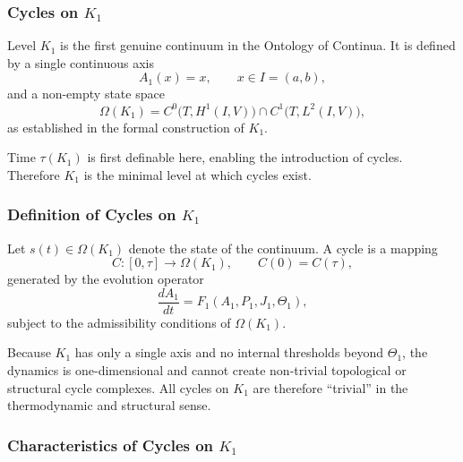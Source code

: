 
\subsubsection{Cycles on \texorpdfstring{$K_1$}{K_1}}
\label{sec:cycles-k1}

Level $K_1$ is the first genuine continuum in the Ontology of
Continua.  
It is defined by a single continuous axis
\[
  A_1(x)=x, \qquad x\in I=(a,b),
\]
and a non-empty state space
\[
  \Omega(K_1)
  = C^0\!\bigl(T, H^1(I,V)\bigr)
    \cap C^1\!\bigl(T, L^2(I,V)\bigr),
\]
as established in the formal construction of $K_1$.

Time $\tau(K_1)$ is first definable here, enabling the introduction of
cycles.  
Therefore $K_1$ is the minimal level at which cycles exist.

\subsubsection{Definition of Cycles on \texorpdfstring{$K_1$}{K_1}}

Let $s(t)\in\Omega(K_1)$ denote the state of the continuum.  
A cycle is a mapping
\[
  C:[0,\tau]\to\Omega(K_1), \qquad
  C(0)=C(\tau),
\]
generated by the evolution operator
\[
  \frac{dA_1}{dt} = F_1(A_1,P_1,J_1,\Theta_1),
\]
subject to the admissibility conditions of $\Omega(K_1)$.

Because $K_1$ has only a single axis and no internal thresholds beyond
$\Theta_1$, the dynamics is one-dimensional and cannot create
non-trivial topological or structural cycle complexes.
All cycles on $K_1$ are therefore ``trivial'' in the thermodynamic and
structural sense.

\subsubsection{Characteristics of Cycles on \texorpdfstring{$K_1$}{K_1}}

